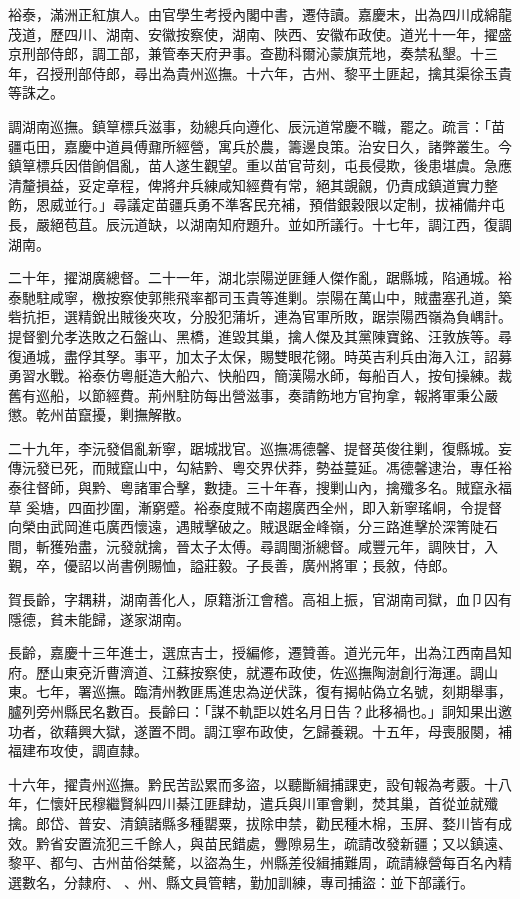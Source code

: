 \begin{pinyinscope}
裕泰，滿洲正紅旗人。由官學生考授內閣中書，遷侍讀。嘉慶末，出為四川成綿龍茂道，歷四川、湖南、安徽按察使，湖南、陜西、安徽布政使。道光十一年，擢盛京刑部侍郎，調工部，兼管奉天府尹事。查勘科爾沁蒙旗荒地，奏禁私墾。十三年，召授刑部侍郎，尋出為貴州巡撫。十六年，古州、黎平土匪起，擒其渠徐玉貴等誅之。

調湖南巡撫。鎮筸標兵滋事，劾總兵向遵化、辰沅道常慶不職，罷之。疏言：「苗疆屯田，嘉慶中道員傅鼐所經營，寓兵於農，籌邊良策。治安日久，諸弊叢生。今鎮筸標兵因借餉倡亂，苗人遂生觀望。重以苗官苛刻，屯長侵欺，後患堪虞。急應清釐損益，妥定章程，俾將弁兵練咸知經費有常，絕其覬覦，仍責成鎮道實力整飭，恩威並行。」尋議定苗疆兵勇不準客民充補，預借銀穀限以定制，拔補備弁屯長，嚴絕苞苴。辰沅道缺，以湖南知府題升。並如所議行。十七年，調江西，復調湖南。

二十年，擢湖廣總督。二十一年，湖北崇陽逆匪鍾人傑作亂，踞縣城，陷通城。裕泰馳駐咸寧，檄按察使郭熊飛率都司玉貴等進剿。崇陽在萬山中，賊盡塞孔道，築砦抗拒，選精銳出賊後夾攻，分股犯蒲圻，連為官軍所敗，踞崇陽西嶺為負嵎計。提督劉允孝迭敗之石盤山、黑橋，進毀其巢，擒人傑及其黨陳寶銘、汪敦族等。尋復通城，盡俘其孥。事平，加太子太保，賜雙眼花翎。時英吉利兵由海入江，詔募勇習水戰。裕泰仿粵艇造大船六、快船四，簡漢陽水師，每船百人，按旬操練。裁舊有巡船，以節經費。荊州駐防每出營滋事，奏請飭地方官拘拿，報將軍秉公嚴懲。乾州苗竄擾，剿撫解散。

二十九年，李沅發倡亂新寧，踞城戕官。巡撫馮德馨、提督英俊往剿，復縣城。妄傳沅發已死，而賊竄山中，勾結黔、粵交界伏莽，勢益蔓延。馮德馨逮治，專任裕泰往督師，與黔、粵諸軍合擊，數捷。三十年春，搜剿山內，擒殲多名。賊竄永福草奚塘，四面抄圍，漸窮蹙。裕泰度賊不南趨廣西全州，即入新寧瑤峒，令提督向榮由武岡進屯廣西懷遠，遇賊擊破之。賊退踞金峰嶺，分三路進擊於深箐陡石間，斬獲殆盡，沅發就擒，晉太子太傅。尋調閩浙總督。咸豐元年，調陜甘，入覲，卒，優詔以尚書例賜恤，謚莊毅。子長善，廣州將軍；長敘，侍郎。

賀長齡，字耦耕，湖南善化人，原籍浙江會稽。高祖上振，官湖南司獄，血⼙囚有隱德，貧未能歸，遂家湖南。

長齡，嘉慶十三年進士，選庶吉士，授編修，遷贊善。道光元年，出為江西南昌知府。歷山東兗沂曹濟道、江蘇按察使，就遷布政使，佐巡撫陶澍創行海運。調山東。七年，署巡撫。臨清州教匪馬進忠為逆伏誅，復有揭帖偽立名號，刻期舉事，臚列旁州縣民名數百。長齡曰：「謀不軌詎以姓名月日告？此移禍也。」詗知果出邀功者，欲藉興大獄，遂置不問。調江寧布政使，乞歸養親。十五年，母喪服闋，補福建布攻使，調直隸。

十六年，擢貴州巡撫。黔民苦訟累而多盜，以聽斷緝捕課吏，設旬報為考覈。十八年，仁懷奸民穆繼賢糾四川綦江匪肆劫，遣兵與川軍會剿，焚其巢，首從並就殲擒。郎岱、普安、清鎮諸縣多種罌粟，拔除申禁，勸民種木棉，玉屏、婺川皆有成效。黔省安置流犯三千餘人，與苗民錯處，釁隙易生，疏請改發新疆；又以鎮遠、黎平、都勻、古州苗俗桀驁，以盜為生，州縣差役緝捕難周，疏請綠營每百名內精選數名，分隸府、、州、縣文員管轄，勤加訓練，專司捕盜：並下部議行。


\end{pinyinscope}
